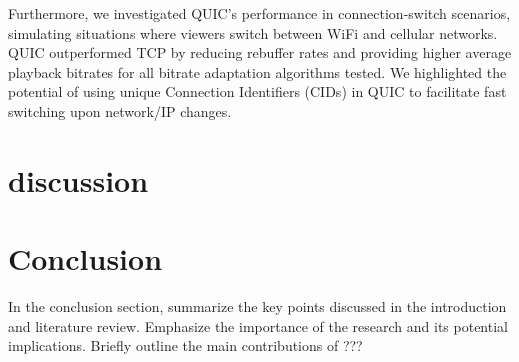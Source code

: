 \documentclass{article}
\begin{document}
Furthermore, we investigated QUIC's performance in connection-switch scenarios, simulating situations where viewers switch between WiFi and cellular networks. QUIC outperformed TCP by reducing rebuffer rates and providing higher average playback bitrates for all bitrate adaptation algorithms tested. We highlighted the potential of using unique Connection Identifiers (CIDs) in QUIC to facilitate fast switching upon network/IP changes.
\section{discussion}

\section{Conclusion}
In the conclusion section, summarize the key points discussed in the introduction and literature review. Emphasize the importance of the research and its potential implications. Briefly outline the main contributions of ???
\end{document}
